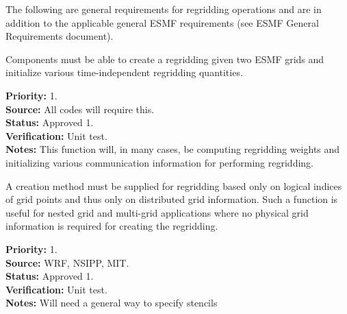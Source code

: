 %



The following are general requirements for regridding operations and are in
addition to the applicable general ESMF requirements (see ESMF General
Requirements document).


Components must be able to create a regridding given two ESMF grids and 
initialize various time-independent regridding quantities.

\begin{reqlist}
{\bf Priority:} 1. \\
{\bf Source:} All codes will require this. \\
{\bf Status:} Approved 1. \\
{\bf Verification:} Unit test. \\
{\bf Notes:} This function will, in many cases, be computing
             regridding weights and initializing various
             communication information for performing regridding.
\end{reqlist}


A creation method must be supplied for regridding based only on logical 
indices of grid points and thus only on distributed grid information.  
Such a function is useful for nested grid and multi-grid applications where 
no physical grid information is required for creating the regridding.

\begin{reqlist}
{\bf Priority:} 1. \\
{\bf Source:}  WRF, NSIPP, MIT. \\
{\bf Status:} Approved 1. \\
{\bf Verification:} Unit test. \\
{\bf Notes:} Will need a general way to specify stencils
\end{reqlist}


